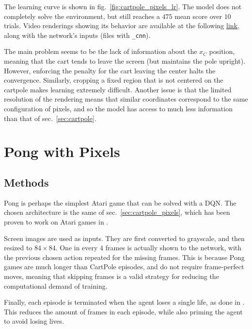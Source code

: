 \documentclass[11pt,a4paper]{scrartcl}
\begin{document}
The learning curve is shown in fig.~\ref{fig:cartpole_pixels_lr}. The model does not completely solve the environment, but still reaches a $475$ mean score over $10$ trials. Video renderings showing its behavior are available at the following \href{https://github.com/Einlar/DLNN_Assignments/tree/main/3/Code/video/02_CartPole_pixels_solved}{link}, along with the network's inputs (files with \texttt{\_cnn}).

\medskip

The main problem seems to be the lack of information about the $x_C$ position, meaning that the cart tends to leave the screen (but maintains the pole upright). However, enforcing the penalty for the cart leaving the center halts the convergence. Similarly, cropping a fixed region that is not centered on the cartpole makes learning extremely difficult. Another issue is that the limited resolution of the rendering means that similar coordinates correspond to the same configuration of pixels, and so the model has access to much less information than that of sec.~\ref{sec:cartpole}.



\section{Pong with Pixels\label{sec:pong}}

\subsection{Methods}
Pong is perhaps the simplest Atari game that can be solved with a DQN. The chosen architecture is the same of sec.~\ref{sec:cartpole_pixels}, which has been proven to work on Atari games in \cite{deepmind_atari}. 

Screen images are used as inputs. They are first converted to grayscale, and then resized to $84\times 84$. One in every $4$ frames is actually shown to the network, with the previous chosen action repeated for the missing frames. This is because Pong games are much longer than CartPole episodes, and do not require frame-perfect moves, meaning that skipping frames is a valid strategy for reducing the computational demand of training. 

Finally, each episode is terminated when the agent loses a single life, as done in \cite{deepmind_nature}. This reduces the amount of frames in each episode, while also priming the agent to avoid losing lives. 
\end{document}
